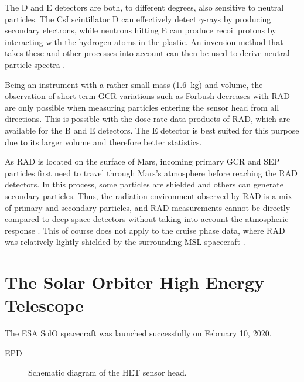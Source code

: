 The D and E detectors are both, to different degrees, also sensitive to neutral particles. The CsI scintillator D can effectively detect $\gamma$-rays by producing secondary electrons, while neutrons hitting E can produce recoil protons by interacting with the hydrogen atoms in the plastic. An inversion method that takes these and other processes into account can then be used to derive neutral particle spectra \citep{Koehler-2011}.

Being an instrument with a rather small mass (\SI{1.6}{\kilogram}) and volume, the observation of short-term \ac{GCR} variations such as Forbush decreases with \ac{RAD} are only possible when measuring particles entering the sensor head from all directions. This is possible with the dose rate data products of \ac{RAD}, which are available for the B and E detectors. The E detector is best suited for this purpose due to its larger volume and therefore better statistics.

As \ac{RAD} is located on the surface of Mars, incoming primary \ac{GCR} and \ac{SEP} particles first need to travel through Mars's atmosphere before reaching the \ac{RAD} detectors. In this process, some particles are shielded and others can generate secondary particles. Thus, the radiation environment observed by \ac{RAD} is a mix of primary and secondary particles, and \ac{RAD} measurements cannot be directly compared to deep-space detectors without taking into account the atmospheric response \citep[see e.g.][]{Guo-2017,Guo-2019}. This of course does not apply to the cruise phase data, where \ac{RAD} was relatively lightly shielded by the surrounding \ac{MSL} spacecraft \citep{Zeitlin-2013-cruise,guo2015cruise}.


\section{The Solar Orbiter High Energy Telescope}
\label{sec:solohet}

The ESA \ac{SolO} spacecraft \citep{Mueller-2020-SolO} was launched successfully on February 10, 2020.

\acl{EPD} \citep[\acs{EPD},]{RodriguezPacheco-2019-EPD}

\begin{figure}
    \centering
    
    \caption[Schematic diagram of the \acs{HET} sensor head]{Schematic diagram of the \ac{HET} sensor head.}
    \label{fig:het-sensorhead}
\end{figure}

